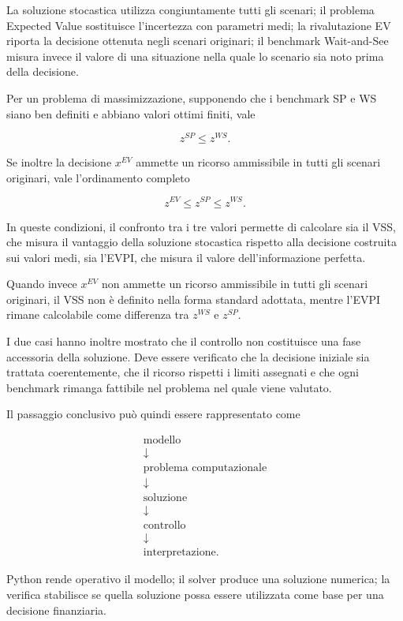 La soluzione stocastica utilizza congiuntamente tutti gli scenari; il problema
Expected Value sostituisce l'incertezza con parametri medi; la rivalutazione
EV riporta la decisione ottenuta negli scenari originari; il benchmark
Wait-and-See misura invece il valore di una situazione nella quale lo scenario
sia noto prima della decisione.


Per un problema di massimizzazione,
supponendo che i benchmark SP e WS
siano ben definiti e abbiano valori
ottimi finiti, vale

\[
z^{SP}\leq z^{WS}.
\]

Se inoltre la decisione $x^{EV}$
ammette un ricorso ammissibile
in tutti gli scenari originari,
vale l'ordinamento completo

\[
z^{EV}\leq z^{SP}\leq z^{WS}.
\]

In queste condizioni, il confronto
tra i tre valori permette di calcolare
sia il VSS, che misura il vantaggio
della soluzione stocastica rispetto
alla decisione costruita sui valori medi,
sia l'EVPI, che misura il valore
dell'informazione perfetta.

Quando invece $x^{EV}$ non ammette
un ricorso ammissibile in tutti
gli scenari originari, il VSS
non \`{e} definito nella forma standard
adottata, mentre l'EVPI rimane
calcolabile come differenza
tra $z^{WS}$ e $z^{SP}$.

I due casi hanno inoltre mostrato che il controllo non costituisce una fase
accessoria della soluzione. Deve essere verificato che la decisione iniziale
sia trattata coerentemente, che il ricorso rispetti i limiti assegnati e che
ogni benchmark rimanga fattibile nel problema nel quale viene valutato.

Il passaggio conclusivo pu\`o quindi essere rappresentato come

\begin{gather*}
\text{modello}\\
\downarrow\\
\text{problema computazionale}\\
\downarrow\\
\text{soluzione}\\
\downarrow\\
\text{controllo}\\
\downarrow\\
\text{interpretazione}.
  \end{gather*}

Python rende operativo il modello; il solver produce una soluzione numerica;
la verifica stabilisce se quella soluzione possa essere utilizzata come base
per una decisione finanziaria.
